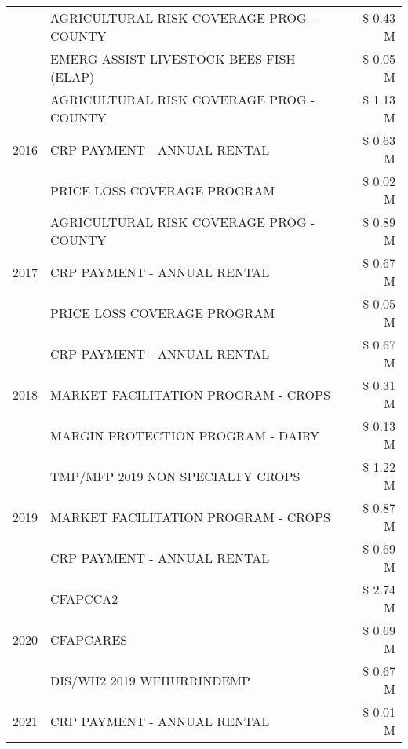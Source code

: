 \begin{tabular}{llr}
 & AGRICULTURAL RISK COVERAGE PROG - COUNTY & \$ 0.43 M \\
 & EMERG ASSIST LIVESTOCK BEES FISH (ELAP) & \$ 0.05 M \\
\cline{1-3}
\multirow[t]{3}{*}{2016} & AGRICULTURAL RISK COVERAGE PROG - COUNTY & \$ 1.13 M \\
 & CRP PAYMENT - ANNUAL RENTAL & \$ 0.63 M \\
 & PRICE LOSS COVERAGE PROGRAM & \$ 0.02 M \\
\cline{1-3}
\multirow[t]{3}{*}{2017} & AGRICULTURAL RISK COVERAGE PROG - COUNTY & \$ 0.89 M \\
 & CRP PAYMENT - ANNUAL RENTAL & \$ 0.67 M \\
 & PRICE LOSS COVERAGE PROGRAM & \$ 0.05 M \\
\cline{1-3}
\multirow[t]{3}{*}{2018} & CRP PAYMENT - ANNUAL RENTAL & \$ 0.67 M \\
 & MARKET FACILITATION PROGRAM - CROPS & \$ 0.31 M \\
 & MARGIN PROTECTION PROGRAM - DAIRY & \$ 0.13 M \\
\cline{1-3}
\multirow[t]{3}{*}{2019} & TMP/MFP 2019 NON SPECIALTY CROPS & \$ 1.22 M \\
 & MARKET FACILITATION PROGRAM - CROPS & \$ 0.87 M \\
 & CRP PAYMENT - ANNUAL RENTAL & \$ 0.69 M \\
\cline{1-3}
\multirow[t]{3}{*}{2020} & CFAPCCA2 & \$ 2.74 M \\
 & CFAPCARES & \$ 0.69 M \\
 & DIS/WH2 2019 WFHURRINDEMP & \$ 0.67 M \\
\cline{1-3}
2021 & CRP PAYMENT - ANNUAL RENTAL & \$ 0.01 M \\
\cline{1-3}
\bottomrule
\end{tabular}
